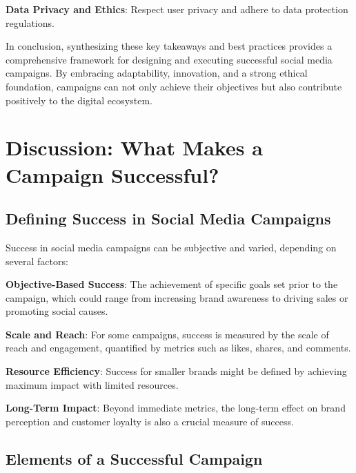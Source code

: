 \documentclass[
]{book}
\begin{document}
\textbf{Data Privacy and Ethics}: Respect user privacy and adhere to data protection regulations.

In conclusion, synthesizing these key takeaways and best practices provides a comprehensive framework for designing and executing successful social media campaigns. By embracing adaptability, innovation, and a strong ethical foundation, campaigns can not only achieve their objectives but also contribute positively to the digital ecosystem.

\hypertarget{discussion-what-makes-a-campaign-successful}{%
\section*{Discussion: What Makes a Campaign Successful?}\label{discussion-what-makes-a-campaign-successful}}

\hypertarget{defining-success-in-social-media-campaigns}{%
\subsection{Defining Success in Social Media Campaigns}\label{defining-success-in-social-media-campaigns}}

Success in social media campaigns can be subjective and varied, depending on several factors:

\textbf{Objective-Based Success}: The achievement of specific goals set prior to the campaign, which could range from increasing brand awareness to driving sales or promoting social causes.

\textbf{Scale and Reach}: For some campaigns, success is measured by the scale of reach and engagement, quantified by metrics such as likes, shares, and comments.

\textbf{Resource Efficiency}: Success for smaller brands might be defined by achieving maximum impact with limited resources.

\textbf{Long-Term Impact}: Beyond immediate metrics, the long-term effect on brand perception and customer loyalty is also a crucial measure of success.

\hypertarget{elements-of-a-successful-campaign}{%
\subsection{Elements of a Successful Campaign}\label{elements-of-a-successful-campaign}}
\end{document}

